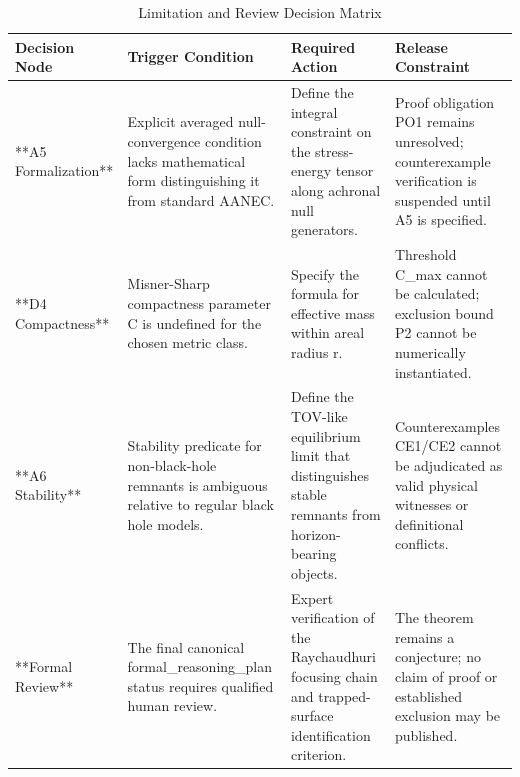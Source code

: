 \documentclass[conference]{IEEEtran}
\begin{document}
\begin{table}[htbp]
\centering
\footnotesize
\setlength{\tabcolsep}{3pt}
\renewcommand{\arraystretch}{1.12}
\caption{Limitation and Review Decision Matrix}
\label{tab:risk-limitations-and-review-rlr-02}
\begin{tabular}{|p{}|p{}|p{}|p{}|}
\hline
Decision Node & Trigger Condition & Required Action & Release Constraint \\\hline
**A5 Formalization** & Explicit averaged null-convergence condition lacks mathematical form distinguishing it from standard AANEC. & Define the integral constraint on the stress-energy tensor along achronal null generators. & Proof obligation PO1 remains unresolved; counterexample verification is suspended until A5 is specified. \\\hline
**D4 Compactness** & Misner-Sharp compactness parameter C is undefined for the chosen metric class. & Specify the formula for effective mass within areal radius r. & Threshold C\_max cannot be calculated; exclusion bound P2 cannot be numerically instantiated. \\\hline
**A6 Stability** & Stability predicate for non-black-hole remnants is ambiguous relative to regular black hole models. & Define the TOV-like equilibrium limit that distinguishes stable remnants from horizon-bearing objects. & Counterexamples CE1/CE2 cannot be adjudicated as valid physical witnesses or definitional conflicts. \\\hline
**Formal Review** & The final canonical formal\_reasoning\_plan status requires qualified human review. & Expert verification of the Raychaudhuri focusing chain and trapped-surface identification criterion. & The theorem remains a conjecture; no claim of proof or established exclusion may be published. \\\hline
\end{tabular}
\end{table}
\end{document}
